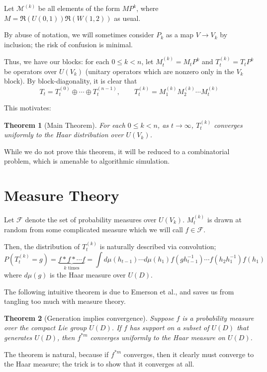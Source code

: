 \documentclass[fleqn,12pt]{article}
\newtheorem{theorem}{Theorem}
\begin{document}
Let $\mathcal{M}^{(k)}$ be all elements of the form $M P^k$,
where $M = \mathfrak{R}(U(0,1)) \mathfrak{R}(W(1,2))$
as usual.

By abuse of notation, we will sometimes consider $P_k$ as a map $V\to V_k$
by inclusion; the risk of confusion is minimal.

Thus, we have our blocks: for each $0\leq k < n$, let
$M_t^{(k)} = M_t P^k$ and
$T_t^{(k)} = T_t P^k$ be operators over $U(V_k)$ (unitary operators
which are nonzero only in the $V_k$ block).
By block-diagonality, it is clear that
\[
    T_t = T_t^{(0)} \oplus \cdots \oplus T_t^{(n-1)},\qquad T_t^{(k)} = M_1^{(k)} M_2^{(k)} \cdots M_t^{(k)}
\]

This motivates:
\begin{theorem}
    [Main Theorem]
    For each $0\leq k < n$, as $t\to \infty$, $T_t^{(k)}$
    converges uniformly to
    the Haar distribution over $U(V_k)$.
\end{theorem}

While we do not prove this theorem, it will be reduced to a combinatorial problem,
which is amenable to algorithmic simulation.

\section{Measure Theory}

Let $\mathcal{F}$ denote the set of probability measures over $U(V_k)$.
$M^{(k)}_t$ is drawn at random from some complicated
measure which we will call $f\in \mathcal{F}$.

Then, the distribution of $T^{(k)}_t$ is naturally described via convolution;
\[
    P(T^{(k)}_t = g) = \underbrace{f * f * \cdots f}_{k\text{ times}}
    = \int d \mu(h_{t-1})\cdots d \mu(h_1) f(gh_{t-1}^{-1})\cdots f(h_2 h_1^{-1}) f(h_1)
\]
where $d \mu(g)$ is the Haar measure over $U(D)$.


The following intuitive theorem is due to
Emerson et al.\cite{Emerson_2005}, and saves us from tangling
too much with measure theory.
\begin{theorem}
    [Generation implies convergence]
    Suppose $f$ is a probability measure over the compact Lie group $U(D)$.
    If $f$ has support on a subset of $U(D)$ that generates $U(D)$,
    then $f^{*m}$ converges uniformly to the Haar measure on $U(D)$.
\end{theorem}

The theorem is natural, because if $f^{*m}$ converges, then it clearly
must converge to the Haar measure; the trick
is to show that it converges at all.
\end{document}
